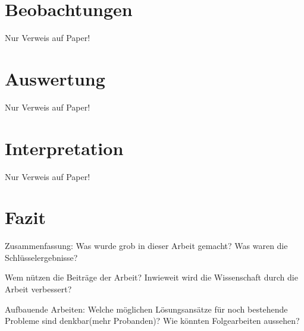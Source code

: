 \documentclass{Bericht}
\begin{document}
\section{Beobachtungen}
	Nur Verweis auf Paper!

\section{Auswertung}
	Nur Verweis auf Paper!

\section{Interpretation}
	Nur Verweis auf Paper!
	
\section{Fazit}

	Zusammenfassung: Was wurde grob in dieser Arbeit gemacht? Was waren die Schlüsselergebnisse?

	Wem nützen die Beiträge der Arbeit? Inwieweit wird die Wissenschaft durch die Arbeit verbessert?

	Aufbauende Arbeiten: Welche möglichen Lösungsansätze für noch bestehende Probleme sind denkbar(mehr Probanden)? Wie könnten Folgearbeiten aussehen?
\end{document}
